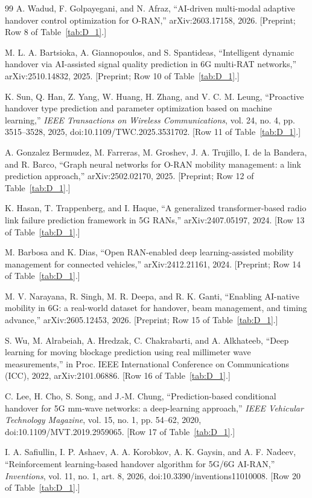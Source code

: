 \begin{thebibliography}{99}
 A. Wadud, F. Golpayegani, and N. Afraz, ``AI-driven multi-modal adaptive handover control optimization for O-RAN,'' arXiv:2603.17158, 2026. [Preprint; Row 8 of Table~\ref{tab:D_1}.]

 M. L. A. Bartsioka, A. Giannopoulos, and S. Spantideas, ``Intelligent dynamic handover via AI-assisted signal quality prediction in 6G multi-RAT networks,'' arXiv:2510.14832, 2025. [Preprint; Row 10 of Table~\ref{tab:D_1}.]

 K. Sun, Q. Han, Z. Yang, W. Huang, H. Zhang, and V. C. M. Leung, ``Proactive handover type prediction and parameter optimization based on machine learning,'' \textit{IEEE Transactions on Wireless Communications}, vol. 24, no. 4, pp. 3515--3528, 2025, doi:10.1109/TWC.2025.3531702. [Row 11 of Table~\ref{tab:D_1}.]

 A. Gonzalez Bermudez, M. Farreras, M. Groshev, J. A. Trujillo, I. de la Bandera, and R. Barco, ``Graph neural networks for O-RAN mobility management: a link prediction approach,'' arXiv:2502.02170, 2025. [Preprint; Row 12 of Table~\ref{tab:D_1}.]

 K. Hasan, T. Trappenberg, and I. Haque, ``A generalized transformer-based radio link failure prediction framework in 5G RANs,'' arXiv:2407.05197, 2024. [Row 13 of Table~\ref{tab:D_1}.]

 M. Barbosa and K. Dias, ``Open RAN-enabled deep learning-assisted mobility management for connected vehicles,'' arXiv:2412.21161, 2024. [Preprint; Row 14 of Table~\ref{tab:D_1}.]

 M. V. Narayana, R. Singh, M. R. Deepa, and R. K. Ganti, ``Enabling AI-native mobility in 6G: a real-world dataset for handover, beam management, and timing advance,'' arXiv:2605.12453, 2026. [Preprint; Row 15 of Table~\ref{tab:D_1}.]

 S. Wu, M. Alrabeiah, A. Hredzak, C. Chakrabarti, and A. Alkhateeb, ``Deep learning for moving blockage prediction using real millimeter wave measurements,'' in Proc. IEEE International Conference on Communications (ICC), 2022, arXiv:2101.06886. [Row 16 of Table~\ref{tab:D_1}.]

 C. Lee, H. Cho, S. Song, and J.-M. Chung, ``Prediction-based conditional handover for 5G mm-wave networks: a deep-learning approach,'' \textit{IEEE Vehicular Technology Magazine}, vol. 15, no. 1, pp. 54--62, 2020, doi:10.1109/MVT.2019.2959065. [Row 17 of Table~\ref{tab:D_1}.]

 I. A. Safiullin, I. P. Ashaev, A. A. Korobkov, A. K. Gaysin, and A. F. Nadeev, ``Reinforcement learning-based handover algorithm for 5G/6G AI-RAN,'' \textit{Inventions}, vol. 11, no. 1, art. 8, 2026, doi:10.3390/inventions11010008. [Row 20 of Table~\ref{tab:D_1}.]

\end{thebibliography}
\onehalfspacing
